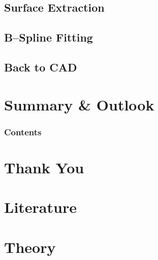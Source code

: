 \documentclass[9pt,pdftex]{beamer}
\begin{document}
%
\subsection{Surface Extraction}



\subsection{B--Spline Fitting}


\subsection{Back to CAD}


\section{Summary \& Outlook}
  \begin{frame}
  \frametitle{Contents}
  \tableofcontents[currentsection]
  \end{frame}

\section*{Thank You}

\section*{Literature}

\section*{Theory}

\end{document}
